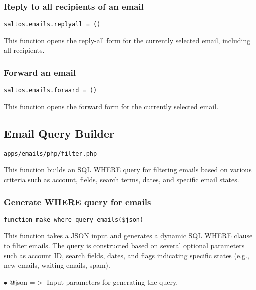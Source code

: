 \documentclass[a4paper]{article}
\begin{document}
\hypertarget{toc78}{}
\subsubsection{Reply to all recipients of an email}

\begin{lstlisting}
saltos.emails.replyall = ()
\end{lstlisting}

This function opens the reply-all form for the currently selected email, including all recipients.

\hypertarget{toc79}{}
\subsubsection{Forward an email}

\begin{lstlisting}
saltos.emails.forward = ()
\end{lstlisting}

This function opens the forward form for the currently selected email.

\hypertarget{toc80}{}
\subsection{Email Query Builder}

\begin{lstlisting}
apps/emails/php/filter.php
\end{lstlisting}

This function builds an SQL WHERE query for filtering emails based on various criteria
such as account, fields, search terms, dates, and specific email states.

\hypertarget{toc81}{}
\subsubsection{Generate WHERE query for emails}

\begin{lstlisting}
function make_where_query_emails($json)
\end{lstlisting}

This function takes a JSON input and generates a dynamic SQL WHERE clause to filter emails.
The query is constructed based on several optional parameters such as account ID, search fields,
dates, and flags indicating specific states (e.g., new emails, waiting emails, spam).

\begin{compactitem}
\item[\color{myblue}$\bullet$] @json =$>$ Input parameters for generating the query.
\end{compactitem}
\end{document}
